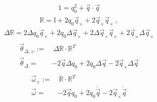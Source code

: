 \documentclass[letterpaper,10pt,english]{jupyterBook}
\begin{document}
\sphinxAtStartPar
{}
\begin{equation*}
\begin{split}1 = q_0^2 + \vec{q} \cdot \vec{q}\end{split}
\end{equation*}
\sphinxAtStartPar
{}
\begin{equation*}
\begin{split}\mathbb{R} = \mathbb{I} + 2 q_0 \vec{q}_\times + 2 \vec{q}_{\times} \vec{q}_{\times} \ ,\end{split}
\end{equation*}
\sphinxAtStartPar
{}
\begin{equation*}
\begin{split}\Delta \mathbb{R} = 2 \Delta q_0 \vec{q}_\times + 2 q_0 \Delta \vec{q}_\times + 2 \Delta \vec{q}_\times \vec{q}_\times + 2 \vec{q}_\times \Delta \vec{q}_\times\end{split}
\end{equation*}\begin{equation*}
\begin{split}\begin{aligned}
    \vec{\theta}_{\Delta, \times} := & \ \Delta \mathbb{R} \cdot \mathbb{R}^T \\
    \vec{\theta}_{\Delta} = & - 2 \vec{q} \Delta q_0 + 2 q_0 \Delta \vec{q} - 2 \vec{q}_\times \Delta \vec{q}
  \end{aligned}\end{split}
\end{equation*}
\sphinxAtStartPar
{}
\begin{equation*}
\begin{split}\begin{aligned}
    \vec{\omega}_\times := & \ \dot{\mathbb{R}} \cdot \mathbb{R}^T  \\
    \vec{\omega} = & - 2 \vec{q} \dot{q}_0 + 2 q_0 \dot{\vec{q}} - 2 \vec{q}_\times \dot{\vec{q}}
  \end{aligned}\end{split}
\end{equation*}
\end{document}
